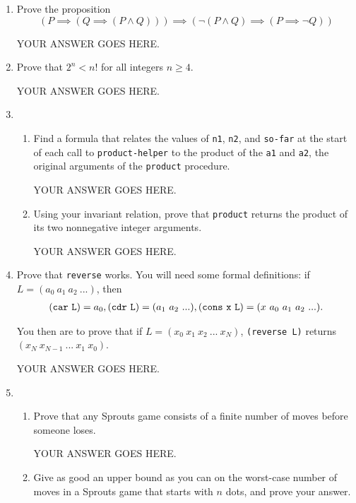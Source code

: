 \documentclass[11pt,fleqn]{article}
\begin{document}
\begin{enumerate}

\item
Prove the proposition
\begin{displaymath}
(P \implies (Q \implies (P \land Q))) 
\implies (\lnot (P \land Q) \implies (P \implies \lnot Q))
\end{displaymath}

YOUR ANSWER GOES HERE.

\item
Prove that $2^n < n!$ for all integers $n \ge 4$.

YOUR ANSWER GOES HERE.

\item
\begin{enumerate}
\item
Find a formula that relates the values of {\tt n1}, {\tt n2}, and {\tt so-far}
at the start of each call to {\tt product-helper} to the product of the
{\tt a1} and {\tt a2}, the original arguments of the {\tt product} procedure.

YOUR ANSWER GOES HERE.
\item
Using your invariant relation, prove that {\tt product} returns the product
of its two nonnegative integer arguments.

YOUR ANSWER GOES HERE.
\end{enumerate}

\item
Prove that {\tt reverse} works.
You will need some formal definitions:
if $L = (a_0\ a_1\ a_2\ ...)$, then 
\begin{eqnarray*}
{\tt(car\ L)} = a_0,
{\tt (cdr\ L)} = (a_1\ a_2\ ...), 
{\tt (cons\ x\ L)} = (x\ a_0\ a_1\ a_2\ ...).
\end{eqnarray*}

You then are to prove that if
$L = (x_0\ x_1\ x_2\ ...\ x_N)$, {\tt (reverse L)} returns $(x_N\ x_{N-1}\ ...\ x_1\ x_0)$.

YOUR ANSWER GOES HERE.

\item
\begin{enumerate}
\item
Prove that any Sprouts game consists of a finite number of moves
before someone loses.

YOUR ANSWER GOES HERE.
\item
Give as good an upper bound as you can on the worst-case number of
moves in a Sprouts game that starts with $n$ dots, and prove your answer.


\end{enumerate}
\end{enumerate}
\end{document}
